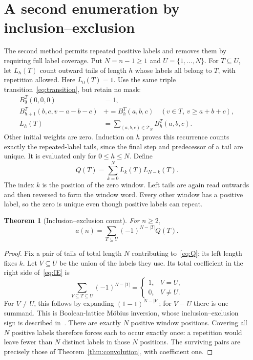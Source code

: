 \documentclass[11pt]{article}
\newtheorem{theorem}{Theorem}[section]
\theoremstyle{definition}
\theoremstyle{remark}
\begin{document}
\section{A second enumeration by inclusion--exclusion}
\label{sec:IE}

The second method permits repeated positive labels and removes them by
requiring full label coverage. Put $N=n-1\geq1$ and $U=\{1,\ldots,N\}$.
For $T\subseteq U$, let $L_h(T)$ count outward tails of length $h$ whose
labels all belong to $T$, with repetition allowed. Here $L_0(T)=1$.
Use the same triple transition~\eqref{eq:transition}, but retain no mask:
\begin{equation}
 \begin{split}
 B_0^T(0,0,0)&=1,\\
 B_{h+1}^T(b,c,v-a-b-c)&\mathrel{+}=B_h^T(a,b,c)
       \quad(v\in T,\ v\geq a+b+c),\\
 L_h(T)&=\sum_{(a,b,c)\in\mathcal T_N} B_h^T(a,b,c).
 \end{split}
 \label{eq:walkDP}
\end{equation}
Other initial weights are zero. Induction on $h$ proves this recurrence
counts exactly the repeated-label tails, since the final step and
predecessor of a tail are unique. It is evaluated only for $0\leq h\leq N$.
Define
\begin{equation}
 Q(T)=\sum_{k=0}^N L_k(T)L_{N-k}(T).
 \label{eq:Q}
\end{equation}
The index $k$ is the position of the zero window. Left tails are again read
outwards and then reversed to form the window word. Every other window has
a positive label, so the zero is unique even though positive labels can repeat.

\begin{theorem}[Inclusion--exclusion count]
\label{thm:IE}
For $n\geq2$,
\begin{equation}
 a(n)=\sum_{T\subseteq U}(-1)^{N-|T|}Q(T).
 \label{eq:IE}
\end{equation}
\end{theorem}
\begin{proof}
Fix a pair of tails of total length $N$ contributing to~\eqref{eq:Q};
its left length fixes $k$. Let $V\subseteq U$
be the union of the labels they use. Its total coefficient in the right
side of~\eqref{eq:IE} is
\[
 \sum_{V\subseteq T\subseteq U}(-1)^{N-|T|}
 =\begin{cases}1,&V=U,\\0,&V\ne U.\end{cases}
\]
For $V\ne U$, this follows by expanding $(1-1)^{N-|V|}$; for $V=U$ there
is one summand. This is Boolean-lattice M\"obius inversion, whose
inclusion--exclusion sign is described in~\cite[Section 3]{rota}.
There are exactly $N$ positive window positions. Covering all $N$ positive
labels therefore forces each to occur exactly once: a repetition would leave
fewer than $N$ distinct labels in those $N$ positions. The surviving pairs
are precisely those of Theorem~\ref{thm:convolution}, with coefficient one.
\end{proof}
\end{document}
